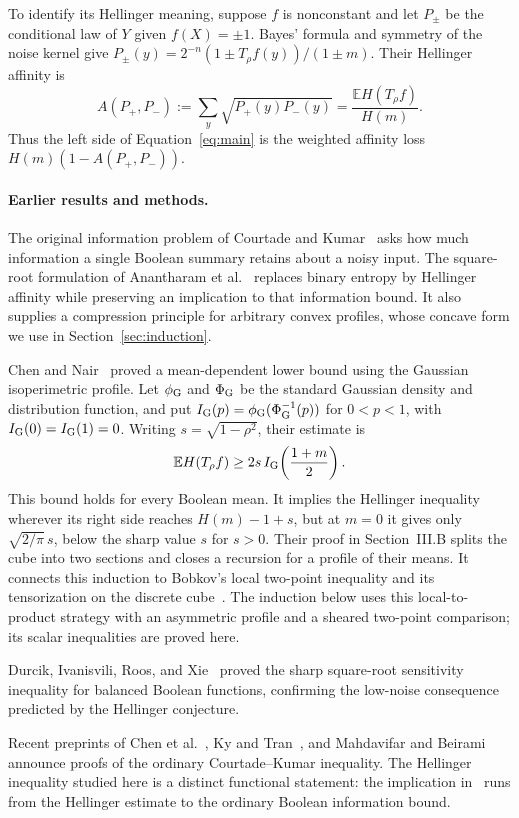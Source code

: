 \documentclass[11pt]{article}
\numberwithin{equation}{section}
\theoremstyle{definition}
\theoremstyle{remark}
\newcommand{\E}{\mathbb E}
\begin{document}
To identify its Hellinger meaning, suppose \(f\) is nonconstant and let
\(P_\pm\) be the conditional law of \(Y\) given \(f(X)=\pm1\).
Bayes' formula and symmetry of the noise kernel give
\(P_\pm(y)=2^{-n}(1\pm T_\rho f(y))/(1\pm m)\). Their Hellinger affinity is
\[
 A(P_+,P_-):=\sum_y\sqrt{P_+(y)P_-(y)}
 =\frac{\E H(T_\rho f)}{H(m)}.
\]
Thus the left side of Equation~\eqref{eq:main} is the weighted affinity
loss \(H(m)(1-A(P_+,P_-))\).

\paragraph{Earlier results and methods.}
The original information problem of Courtade and Kumar~\cite{CK14}
asks how much information a single Boolean summary retains about a
noisy input. The square-root formulation of Anantharam et
al.~\cite{ABCJN} replaces binary entropy by Hellinger affinity while
preserving an implication to that information bound. It also supplies a
compression principle for arbitrary convex profiles, whose concave
form we use in Section~\ref{sec:induction}.

Chen and Nair~\cite[Theorem~2, Equation~(6), and Remark~5]{ChenNair24}
proved a mean-dependent lower bound using the Gaussian isoperimetric
profile. Let $\phi_{\rm G}$ and $\Phi_{\rm G}$ be the standard Gaussian
density and distribution function, and put
$I_{\rm G}(p)=\phi_{\rm G}(\Phi_{\rm G}^{-1}(p))$ for $0<p<1$,
with $I_{\rm G}(0)=I_{\rm G}(1)=0$.
Writing $s=\sqrt{1-\rho^2}$, their estimate is
\[
 \E H(T_\rho f)\ge 2s\,I_{\rm G}\!\left(\frac{1+m}{2}\right).
\]
This bound holds for every Boolean mean. It implies the Hellinger
inequality wherever its right side reaches $H(m)-1+s$, but at $m=0$
it gives only $\sqrt{2/\pi}\,s$, below the sharp value $s$ for $s>0$.
Their proof in Section~III.B splits the cube into two sections and
closes a recursion for a profile of their means. It connects this
induction to Bobkov's local two-point inequality and its tensorization
on the discrete cube~\cite[Proposition~1 and Lemma~1]{Bobkov97}.
The induction below uses this local-to-product strategy with an
asymmetric profile and a sheared two-point comparison; its scalar
inequalities are proved here.

Durcik, Ivanisvili, Roos, and Xie~\cite[Theorem~1.1 and Section~5]{DIRX26}
proved the sharp square-root sensitivity inequality for balanced Boolean
functions, confirming the low-noise consequence predicted by the
Hellinger conjecture.

Recent preprints of Chen et al.~\cite{ChenEtAl2026CK}, Ky and
Tran~\cite{KyTran2026CK}, and Mahdavifar and
Beirami~\cite{MahdavifarBeirami2026CK} announce proofs of the ordinary
Courtade--Kumar inequality. The Hellinger inequality studied here is a
distinct functional statement: the implication in~\cite{ABCJN} runs
from the Hellinger estimate to the ordinary Boolean information bound.
\end{document}

